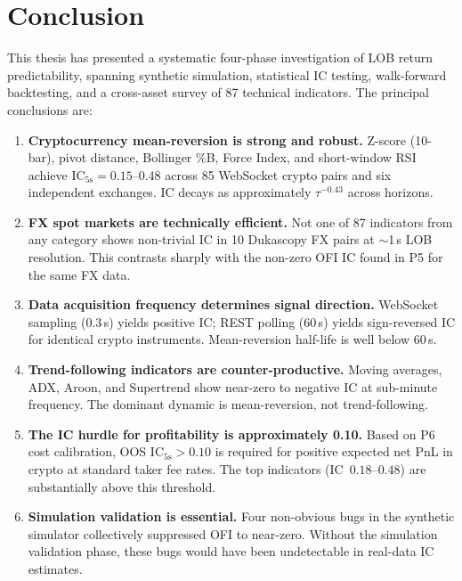 \documentclass[12pt,a4paper]{article}
\theoremstyle{definition}
\theoremstyle{remark}
\newcommand{\IC}{\mathrm{IC}}
\begin{document}
\section{Conclusion}
\label{sec:conclusion}

This thesis has presented a systematic four-phase investigation of
LOB return predictability, spanning synthetic simulation, statistical
IC testing, walk-forward backtesting, and a cross-asset survey of 87
technical indicators. The principal conclusions are:

\begin{enumerate}[label=\textbf{C\arabic*.},leftmargin=2.2em]
  \item \textbf{Cryptocurrency mean-reversion is strong and robust.}
    Z-score (10-bar), pivot distance, Bollinger \%B, Force Index,
    and short-window RSI achieve $\IC_{5\text{s}}=0.15$--$0.48$
    across 85 WebSocket crypto pairs and six independent exchanges.
    IC decays as approximately $\tau^{-0.43}$ across horizons.

  \item \textbf{FX spot markets are technically efficient.}
    Not one of 87 indicators from any category shows non-trivial IC
    in 10 Dukascopy FX pairs at $\sim$1\,s LOB resolution. This
    contrasts sharply with the non-zero OFI IC found in P5 for the
    same FX data.

  \item \textbf{Data acquisition frequency determines signal direction.}
    WebSocket sampling (0.3\,s) yields positive IC; REST polling
    (60\,s) yields sign-reversed IC for identical crypto instruments.
    Mean-reversion half-life is well below 60\,s.

  \item \textbf{Trend-following indicators are counter-productive.}
    Moving averages, ADX, Aroon, and Supertrend show near-zero to
    negative IC at sub-minute frequency. The dominant dynamic is
    mean-reversion, not trend-following.

  \item \textbf{The IC hurdle for profitability is approximately 0.10.}
    Based on P6 cost calibration, OOS $\IC_{5\text{s}} > 0.10$
    is required for positive expected net PnL in crypto at standard
    taker fee rates. The top indicators (IC~$0.18$--$0.48$) are
    substantially above this threshold.

  \item \textbf{Simulation validation is essential.}
    Four non-obvious bugs in the synthetic simulator collectively
    suppressed OFI to near-zero. Without the simulation validation
    phase, these bugs would have been undetectable in real-data IC
    estimates.
\end{enumerate}
\end{document}
